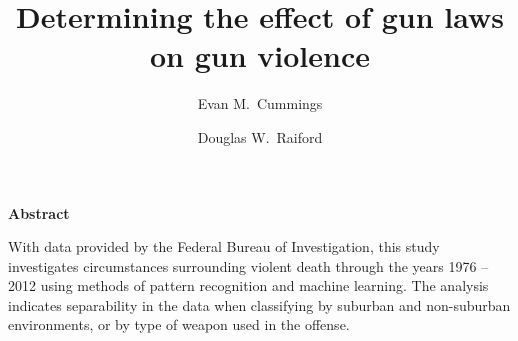

\usepackage[backend=biber, style=authoryear, sorting=nyt]{biblatex}
\renewcommand*{\bibfont}{\normalsize}




\title{Determining the effect of gun laws on gun violence}
\author{Evan M.~Cummings \and Douglas W.~Raiford}

\maketitle

\begin{changemargin}{4cm}{4cm}
\textbf{Abstract}

\small
With data provided by the Federal Bureau of Investigation, this study investigates circumstances surrounding violent death through the years 1976 -- 2012 using methods of pattern recognition and machine learning.  The analysis indicates separability in the data when classifying by suburban and non-suburban environments, or by type of weapon used in the offense.
\normalsize
\vspace{10mm}
\end{changemargin}


